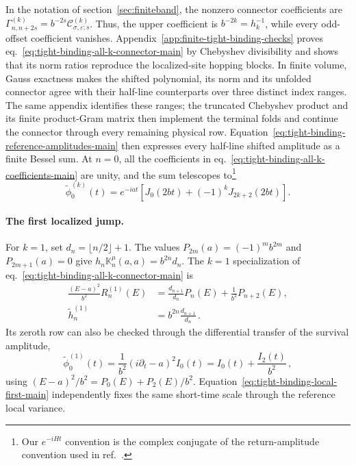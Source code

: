 \documentclass[a4paper,11pt]{article}
\def\ii{i}%
\def\ee{e}%
\theoremstyle{definition}
\theoremstyle{remark}
\newcommand{\ii}{\mathrm i}
\newcommand{\ee}{\mathrm e}
\newcommand{\tphi}{\widetilde\phi}
\newcommand{\thh}{\widetilde h}
\begin{document}
In the notation of section~\ref{sec:finiteband}, the nonzero connector
coefficients are
\(\Gamma_{n,n+2s}^{(k)}=b^{-2s}
\mathcal C_{\sigma,\varepsilon;s}^{(k)}\).  Thus, the upper coefficient
is \(b^{-2k}=h_k^{-1}\), while every odd-offset coefficient vanishes.
Appendix~\ref{app:finite-tight-binding-checks} proves
eq.~\eqref{eq:tight-binding-all-k-connector-main} by Chebyshev
divisibility and shows that its norm ratios reproduce the localized-site
hopping blocks. In finite volume, Gauss exactness makes the shifted polynomial, its norm and its unfolded connector agree with their half-line counterparts over three distinct index ranges. The same appendix identifies these ranges; the truncated Chebyshev product and its finite product-Gram matrix then implement the terminal folds and continue the connector through every remaining physical row. Equation~\eqref{eq:tight-binding-reference-amplitudes-main}
then expresses every half-line shifted amplitude as a finite Bessel sum. At \(n=0\), all the
coefficients in eq.~\eqref{eq:tight-binding-all-k-coefficients-main} are
unity, and the sum telescopes to\footnote{Our \(\ee^{-\ii Ht}\) convention is the complex conjugate of the
return-amplitude convention used in
ref.~\cite{Balasubramanian:2025variations}.}
\begin{equation}
   \tphi_0^{(k)}(t)=
   \ee^{-\ii at}\left[J_0(2bt)+(-1)^kJ_{2k+2}(2bt)\right].
   \label{eq:tight-binding-site-return-main}
\end{equation}

\paragraph{The first localized jump.}
For \(k=1\), set \(d_n=\lfloor n/2\rfloor+1\).  The values
\(P_{2m}(a)=(-1)^mb^{2m}\) and \(P_{2m+1}(a)=0\) give
\(h_n\mathbb K_n^\mu(a,a)=b^{2n}d_n\).  The \(k=1\) specialization of
eq.~\eqref{eq:tight-binding-all-k-connector-main} is
\begin{equation}
\begin{aligned}
   \frac{(E-a)^2}{b^2}R_n^{(1)}(E)
   &=\frac{d_{n+1}}{d_n}P_n(E)+\frac{1}{b^2}P_{n+2}(E),\\
   \thh_n^{(1)}&=b^{2n}\frac{d_{n+1}}{d_n}\,.
\end{aligned}
   \label{eq:tight-binding-first-connector-main}
\end{equation}
Its zeroth row can also be checked through the differential transfer of
the survival amplitude,
\begin{equation}
   \tphi_0^{(1)}(t)
   =\frac{1}{b^2}(\ii\partial_t-a)^2I_0(t)
   =I_0(t)+\frac{I_2(t)}{b^2}\,,
   \label{eq:tight-binding-survival-check-main}
\end{equation}
using
\(
   (E-a)^2/b^2=P_0(E)+P_2(E)/b^2
\).
Equation~\eqref{eq:tight-binding-local-first-main} independently fixes
the same short-time scale through the reference local variance.
\end{document}

